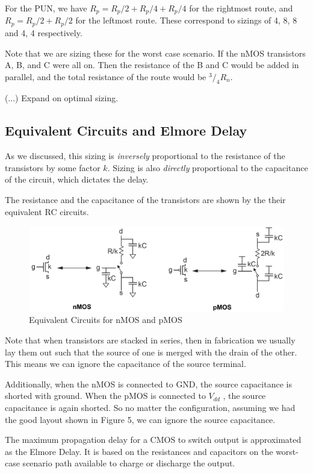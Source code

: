\documentclass{article}
\begin{document}
For the PUN, we have $R_p = R_p/2 + R_p/4 + R_p/4$ for the rightmost route, and $R_p = R_p/2 + R_p/2$ for the leftmost route. These correspond to sizings of 4, 8, 8 and 4, 4 respectively.

Note that we are sizing these for the worst case scenario. If the nMOS transistors A, B, and C were all on. Then the resistance of the B and C would be added in parallel, and the total resistance of the route would be $^3/_4R_n$.

(...) Expand on optimal sizing.

\subsection{Equivalent Circuits and Elmore Delay}

As we discussed, this sizing is \textit{inversely} proportional to the resistance of the transistors by some factor $k$. Sizing is also \textit{directly} proportional to the capacitance of the circuit, which dictates the delay. 

The resistance and the capacitance of the transistors are shown by the their equivalent RC circuits.

\begin{figure}[ht!]
\centering
\includegraphics[width=120mm]{nMOSeq.png}
\caption{Equivalent Circuits for nMOS and pMOS}
\end{figure}

Note that when transistors are stacked in series, then in fabrication we usually lay them out such that the source of one is merged with the drain of the other. This means we can ignore the capacitance of the source terminal. 

Additionally, when the nMOS is connected to GND, the source capacitance is shorted with ground. When the pMOS is connected to $V_{dd}$ , the source capacitance is again shorted. So no matter the configuration, assuming we had the good layout shown in Figure 5, we can ignore the source capacitance.

The maximum propagation delay for a CMOS to switch output is approximated as the Elmore Delay. It is based on the resistances and capacitors on the worst-case scenario path available to charge or discharge the output. 
\end{document}

